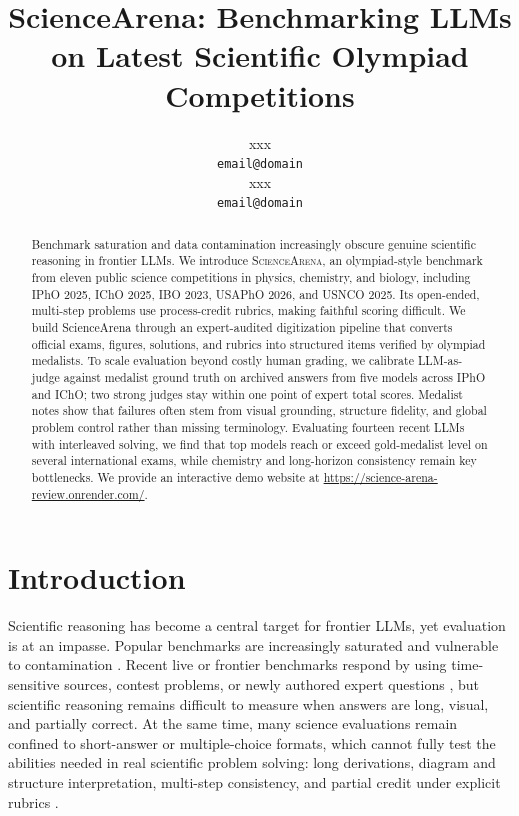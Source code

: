 \documentclass[11pt]{article}
\title{ScienceArena: Benchmarking LLMs on Latest Scientific Olympiad Competitions}
\author{xxx \\
  \texttt{email@domain} \\\And
  xxx \\
  \texttt{email@domain} \\}
\begin{document}
\maketitle
\begin{abstract}
Benchmark saturation and data contamination increasingly obscure genuine scientific reasoning in frontier LLMs. We introduce \textsc{ScienceArena}, an olympiad-style benchmark from eleven public science competitions in physics, chemistry, and biology, including IPhO 2025, IChO 2025, IBO 2023, USAPhO 2026, and USNCO 2025. Its open-ended, multi-step problems use process-credit rubrics, making faithful scoring difficult. We build ScienceArena through an expert-audited digitization pipeline that converts official exams, figures, solutions, and rubrics into structured items verified by olympiad medalists. To scale evaluation beyond costly human grading, we calibrate LLM-as-judge against medalist ground truth on archived answers from five models across IPhO and IChO; two strong judges stay within one point of expert total scores. Medalist notes show that failures often stem from visual grounding, structure fidelity, and global problem control rather than missing terminology. Evaluating fourteen recent LLMs with interleaved solving, we find that top models reach or exceed gold-medalist level on several international exams, while chemistry and long-horizon consistency remain key bottlenecks. We provide an interactive demo website at \url{https://science-arena-review.onrender.com/}.
\end{abstract}


\section{Introduction}
Scientific reasoning has become a central target for frontier LLMs, yet evaluation is at an impasse.
Popular benchmarks are increasingly saturated and vulnerable to contamination \citep{hendrycks2021mmlu,li2023contamination,rein2023gpqa,white2024livebench,phan2025hle}.
Recent live or frontier benchmarks respond by using time-sensitive sources, contest problems, or newly authored expert questions \citep{jain2024livecodebench,glazer2024frontiermath,balunovic2025matharena}, but scientific reasoning remains difficult to measure when answers are long, visual, and partially correct.
At the same time, many science evaluations remain confined to short-answer or multiple-choice formats, which cannot fully test the abilities needed in real scientific problem solving: long derivations, diagram and structure interpretation, multi-step consistency, and partial credit under explicit rubrics \citep{wang2023scibench,lu2023mathvista,yue2023mmmu,he2024olympiadbench,lu2022scienceqa,laurent2024labbench,mirza2025chembench}.
\end{document}
